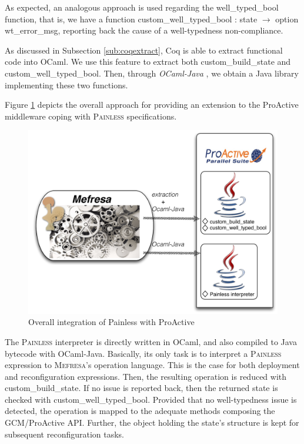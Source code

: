 	As expected, an analogous approach is used regarding the \textsf{well\_typed\_bool} function,
	that is, we have a function \textsf{custom_well_typed_bool : state $\rightarrow$ option wt_error_msg},
	reporting back the cause of a well-typedness non-compliance.
	

	As discussed in Subsection \ref{sub:coqextract}, Coq is able to extract functional code
	into OCaml. We use this feature to extract both \textsf{custom\_build\_state} and 
	\textsf{custom\_well\_typed\_bool}. Then, through \textit{OCaml-Java} \cite{conf/sfp/Clerc12}, 
	we obtain a Java library implementing these two functions. 
	
	Figure \ref{fig:integration} depicts the overall approach for providing an
	extension to the ProActive middleware coping with \textsc{Painless} specifications.
						
					
	\begin{figure}[H]
	\centering
	 \includegraphics[scale=0.7]{figures/chapter5/painlessintegration.pdf} 	
   	\caption{Overall integration of \textsf{Painless} with ProActive}
   	\label{fig:integration}
	\end{figure}
	
	
	\noindent The \textsc{Painless} interpreter is directly written in OCaml, and also
	compiled to Java bytecode with OCaml-Java. 	
	Basically, its only task is to interpret a \textsc{Painless} expression to 
	\textsc{Mefresa}'s \textsf{operation} language. This is the case for both
	deployment and reconfiguration expressions.	
	Then, the resulting
	\textsf{operation} is reduced with \textsf{custom\_build\_state}. If
	no issue is reported back, then the returned \textsf{state} is checked
	with \textsf{custom\_well\_typed\_bool}. Provided that no well-typedness
	issue is detected, the \textsf{operation} is mapped to the adequate methods	
	composing the GCM/ProActive API. Further, the object holding the
	\textsf{state}'s structure is kept for subsequent reconfiguration
	tasks.
		

